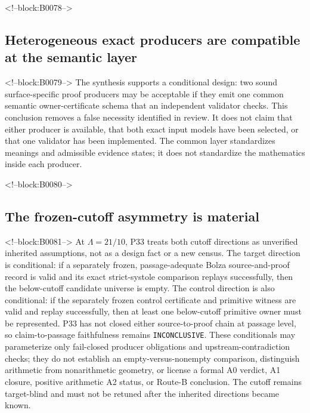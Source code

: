 \documentclass[11pt,a4paper]{article}
\begin{document}
<!--block:B0078-->
\hypertarget{heterogeneous-exact-producers-are-compatible-at-the-semantic-layer}{%
\subsection{Heterogeneous exact producers are compatible at the semantic layer}\label{heterogeneous-exact-producers-are-compatible-at-the-semantic-layer}}

<!--block:B0079-->
The synthesis supports a conditional design: two sound surface-specific proof producers may be acceptable if they emit one common semantic owner-certificate schema that an independent validator checks. This conclusion removes a false necessity identified in review. It does not claim that either producer is available, that both exact input models have been selected, or that one validator has been implemented. The common layer standardizes meanings and admissible evidence states; it does not standardize the mathematics inside each producer.

<!--block:B0080-->
\hypertarget{the-frozen-cutoff-asymmetry-is-material}{%
\subsection{The frozen-cutoff asymmetry is material}\label{the-frozen-cutoff-asymmetry-is-material}}

<!--block:B0081-->
At \(\Lambda=21/10\), P33 treats both cutoff directions as unverified inherited assumptions, not as a design fact or a new census. The target direction is conditional: if a separately frozen, passage-adequate Bolza source-and-proof record is valid and its exact strict-systole comparison replays successfully, then the below-cutoff candidate universe is empty. The control direction is also conditional: if the separately frozen control certificate and primitive witness are valid and replay successfully, then at least one below-cutoff primitive owner must be represented. P33 has not closed either source-to-proof chain at passage level, so claim-to-passage faithfulness remains \texttt{INCONCLUSIVE}. These conditionals may parameterize only fail-closed producer obligations and upstream-contradiction checks; they do not establish an empty-versus-nonempty comparison, distinguish arithmetic from nonarithmetic geometry, or license a formal A0 verdict, A1 closure, positive arithmetic A2 status, or Route-B conclusion. The cutoff remains target-blind and must not be retuned after the inherited directions became known.
\end{document}
